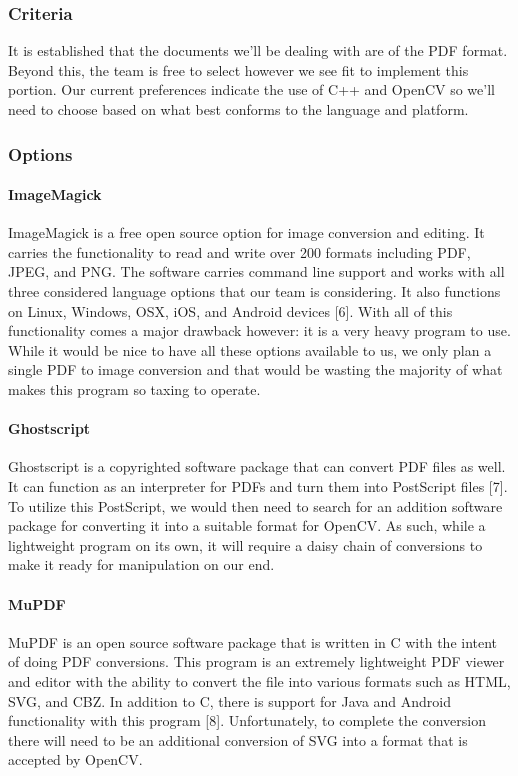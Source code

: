 \documentclass[article, onecolumn, draftclsnofoot,10pt, compsoc]{IEEEtran}
\begin{document}
\subsubsection{Criteria}
It is established that the documents we’ll be dealing with are of the PDF format. Beyond this, the team is free to select however we see fit to implement this portion. Our current preferences indicate the use of C++ and OpenCV so we’ll need to choose based on what best conforms to the language and platform.

\subsubsection{Options}
\paragraph{ImageMagick}
ImageMagick is a free open source option for image conversion and editing. It carries the functionality to read and write over 200 formats including PDF, JPEG, and PNG. The software carries command line support and works with all three considered language options that our team is considering. It also functions on Linux, Windows, OSX, iOS, and Android devices [6]. With all of this functionality comes a major drawback however: it is a very heavy program to use. While it would be nice to have all these options available to us, we only plan a single PDF to image conversion and that would be wasting the majority of what makes this program so taxing to operate.

\paragraph{Ghostscript}
Ghostscript is a copyrighted software package that can convert PDF files as well. It can function as an interpreter for PDFs and turn them into PostScript files [7]. To utilize this PostScript, we would then need to search for an addition software package for converting it into a suitable format for OpenCV. As such, while a lightweight program on its own, it will require a daisy chain of conversions to make it ready for manipulation on our end. 

\paragraph{MuPDF}
MuPDF is an open source software package that is written in C with the intent of doing PDF conversions. This program is an extremely lightweight PDF viewer and editor with the ability to convert the file into various formats such as HTML, SVG, and CBZ. In addition to C, there is support for Java and Android functionality with this program [8]. Unfortunately, to complete the conversion there will need to be an additional conversion of SVG into a format that is accepted by OpenCV. 
\end{document}
